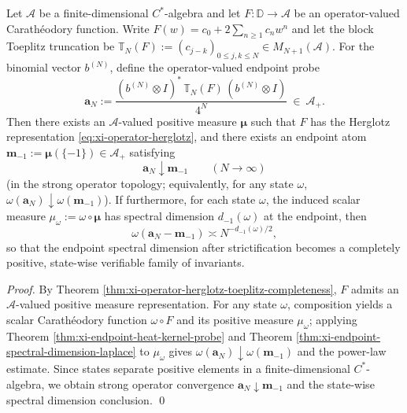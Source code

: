 \begin{theorem}\label{thm:xi-operator-endpoint-heat-kernel-dimension}
Let \(\mathcal{A}\) be a finite-dimensional \(C^\ast\)-algebra and let \(F:\mathbb{D}\to\mathcal{A}\) be an operator-valued Carath\'eodory function.
Write \(F(w)=c_0+2\sum_{n\ge 1}c_n w^n\) and let the block Toeplitz truncation be
\(
\mathbb{T}_N(F):=(c_{j-k})_{0\le j,k\le N}\in M_{N+1}(\mathcal{A})
\).
For the binomial vector \(b^{(N)}\), define the operator-valued endpoint probe
\[
\boxed{\;
\mathbf{a}_N
:=\frac{(b^{(N)}\otimes I)^\ast\,\mathbb{T}_N(F)\,(b^{(N)}\otimes I)}{4^N}\ \in\ \mathcal{A}_+.\;}
\]
Then there exists an \(\mathcal{A}\)-valued positive measure \(\boldsymbol\mu\) such that \(F\) has the Herglotz representation \eqref{eq:xi-operator-herglotz}, and there exists an endpoint atom
\(\mathbf{m}_{-1}:=\boldsymbol\mu(\{-1\})\in\mathcal{A}_+\) satisfying
\[
\boxed{\;
\mathbf{a}_N\downarrow \mathbf{m}_{-1}\qquad(N\to\infty)\;}
\]
(in the strong operator topology; equivalently, for any state \(\omega\), \(\omega(\mathbf{a}_N)\downarrow \omega(\mathbf{m}_{-1})\)).
If furthermore, for each state \(\omega\), the induced scalar measure \(\mu_{\omega}:=\omega\circ\boldsymbol\mu\) has spectral dimension \(d_{-1}(\omega)\) at the endpoint, then
\[
\omega(\mathbf{a}_N-\mathbf{m}_{-1})\asymp N^{-d_{-1}(\omega)/2},
\]
so that the endpoint spectral dimension after strictification becomes a completely positive, state-wise verifiable family of invariants.
\end{theorem}

\begin{proof}
By Theorem \ref{thm:xi-operator-herglotz-toeplitz-completeness}, \(F\) admits an \(\mathcal{A}\)-valued positive measure representation.
For any state \(\omega\), composition yields a scalar Carath\'eodory function \(\omega\circ F\) and its positive measure \(\mu_{\omega}\);
applying Theorem \ref{thm:xi-endpoint-heat-kernel-probe} and Theorem \ref{thm:xi-endpoint-spectral-dimension-laplace} to \(\mu_{\omega}\) gives \(\omega(\mathbf{a}_N)\downarrow \omega(\mathbf{m}_{-1})\) and the power-law estimate.
Since states separate positive elements in a finite-dimensional \(C^\ast\)-algebra, we obtain strong operator convergence \(\mathbf{a}_N\downarrow \mathbf{m}_{-1}\) and the state-wise spectral dimension conclusion. \qed
\end{proof}

